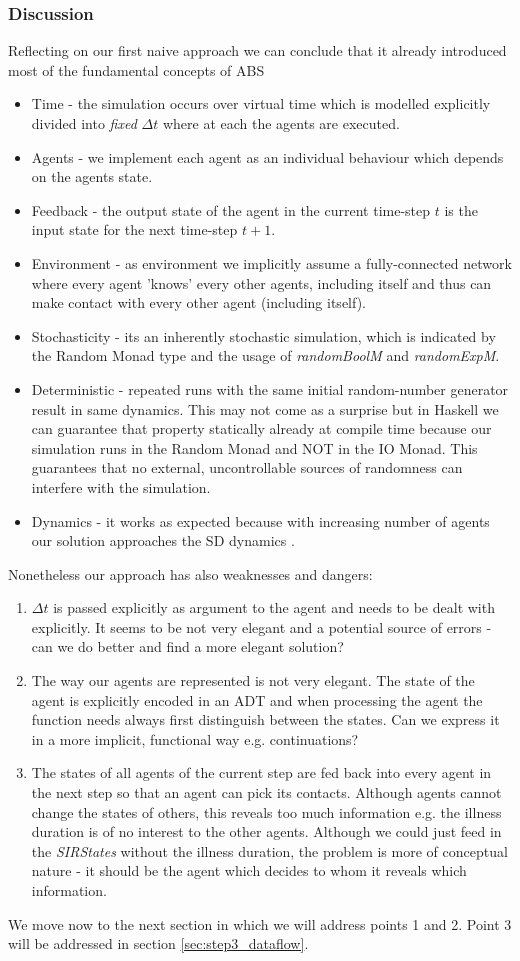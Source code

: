 \subsubsection{Discussion}
Reflecting on our first naive approach we can conclude that it already introduced most of the fundamental concepts of ABS
\begin{itemize}
	\item Time - the simulation occurs over virtual time which is modelled explicitly divided into \textit{fixed} $\Delta t$ where at each the agents are executed.
	\item Agents - we implement each agent as an individual behaviour which depends on the agents state.
	\item Feedback - the output state of the agent in the current time-step $t$ is the input state for the next time-step $t+1$.
	\item Environment - as environment we implicitly assume a fully-connected network where every agent 'knows' every other agents, including itself and thus can make contact with every other agent (including itself).
	\item Stochasticity - its an inherently stochastic simulation, which is indicated by the Random Monad type and the usage of \textit{randomBoolM} and \textit{randomExpM}.
	\item Deterministic - repeated runs with the same initial random-number generator result in same dynamics. This may not come as a surprise but in Haskell we can guarantee that property statically already at compile time because our simulation runs in the Random Monad and NOT in the IO Monad. This guarantees that no external, uncontrollable sources of randomness can interfere with the simulation.
	\item Dynamics - it works as expected because with increasing number of agents our solution approaches the SD dynamics \cite{macal_agent-based_2010}.
\end{itemize}

Nonetheless our approach has also weaknesses and dangers:
\begin{enumerate}
	\item $\Delta t$ is passed explicitly as argument to the agent and needs to be dealt with explicitly. It seems to be not very elegant and a potential source of errors - can we do better and find a more elegant solution? 
	\item The way our agents are represented is not very elegant. The state of the agent is explicitly encoded in an ADT and when processing the agent the function needs always first distinguish between the states. Can we express it in a more implicit, functional way e.g. continuations?
	\item The states of all agents of the current step are fed back into every agent in the next step so that an agent can pick its contacts. Although agents cannot change the states of others, this reveals too much information e.g. the illness duration is of no interest to the other agents. Although we could just feed in the \textit{SIRStates} without the illness duration, the problem is more of conceptual nature - it should be the agent which decides to whom it reveals which information.
\end{enumerate}

We move now to the next section in which we will address points 1 and 2. Point 3 will be addressed in section \ref{sec:step3_dataflow}.